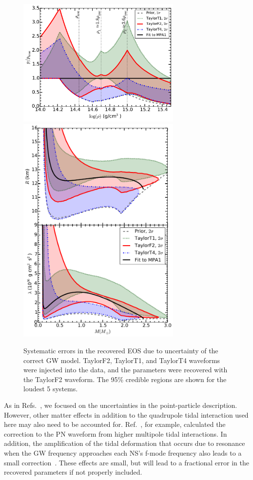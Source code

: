 \documentclass[twocolumn,prd,amssymb,aps,nofootinbib,showpacs,epsf]{revtex4}
\begin{document}
\begin{figure}[!htb]
\begin{center}
\includegraphics[width=3.2in]{LALMCMCmpa1FitCompareF2T1T4ZeroNoiseperror.pdf}\\
\includegraphics[width=3.2in]{LALMCMCmpa1FitCompareF2T1T4ZeroNoiseRadiuslambda.pdf}
\caption{Systematic errors in the recovered EOS due to uncertainty of the correct GW model. TaylorF2, TaylorT1, and TaylorT4 waveforms were injected into the data, and the parameters were recovered with the TaylorF2 waveform. The 95\% credible regions are shown for the loudest 5 systems.}
\label{fig:systematic}
\end{center}
\end{figure}

As in Refs.~\cite{Favata2014, YagiYunes2014, WadeCreightonOchsner2014}, we focused on the uncertainties in the point-particle description. However, other matter effects in addition to the quadrupole tidal interaction used here may also need to be accounted for. Ref.~\cite{Yagi2014}, for example, calculated the correction to the PN waveform from higher multipole tidal interactions. In addition, the amplification of the tidal deformation that occurs due to resonance when the GW frequency approaches each NS's f-mode frequency also leads to a small correction~\cite{FlanaganHinderer2008}. These effects are small, but will lead to a fractional error in the recovered parameters if not properly included. 
\end{document}
